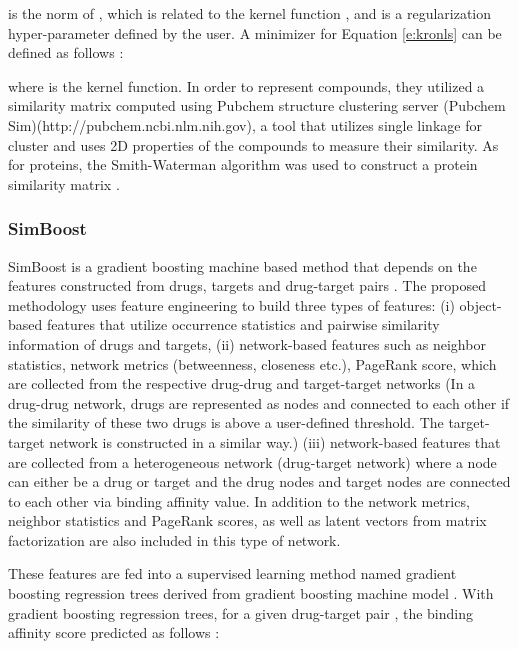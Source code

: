 \documentclass[11pt,letterpaper]{article}
\begin{document}
 is the norm of , which is related to the kernel function , and
 is a regularization hyper-parameter defined by the user.  A minimizer for Equation \ref{e:kronls} can be defined as follows \cite{kimeldorf1971some}:

where  is the kernel function. In order to represent compounds, they utilized a similarity matrix   computed using Pubchem structure clustering server (Pubchem Sim)(http://pubchem.ncbi.nlm.nih.gov), a tool that utilizes single linkage for cluster and uses  2D properties of the compounds to measure their similarity. As for proteins, the Smith-Waterman algorithm was used to construct a protein similarity matrix \cite{smith1981identification}.

\subsubsection*{SimBoost}

SimBoost is a gradient boosting machine based method that depends on the features constructed from drugs, targets and drug-target pairs \cite{he2017simboost}.  The proposed methodology uses feature engineering to build three types of features: (i) object-based features that utilize occurrence statistics and pairwise similarity information of drugs and targets, (ii) network-based features such as neighbor statistics, network metrics (betweenness, closeness etc.), PageRank score, which are collected from the respective drug-drug and target-target networks (In a drug-drug network, drugs are represented as nodes and connected to each other if the similarity of these two drugs is above a user-defined threshold. The target-target network is constructed in a similar way.) (iii) network-based features that are collected from a heterogeneous network (drug-target network) where a node can either be a drug or target and the drug nodes and target nodes  are connected to each other via binding affinity value. In addition to the network metrics, neighbor statistics and PageRank scores, as well as latent vectors from matrix factorization are also included in this type of network.



These features are fed into a supervised learning method named gradient boosting regression trees \cite{chen2015higgs,chen2016xgboost} derived from gradient boosting machine model \cite{friedman2001greedy}. With gradient boosting regression trees, for a given drug-target pair , the binding affinity score  predicted as follows \cite{he2017simboost}:
\end{document}
